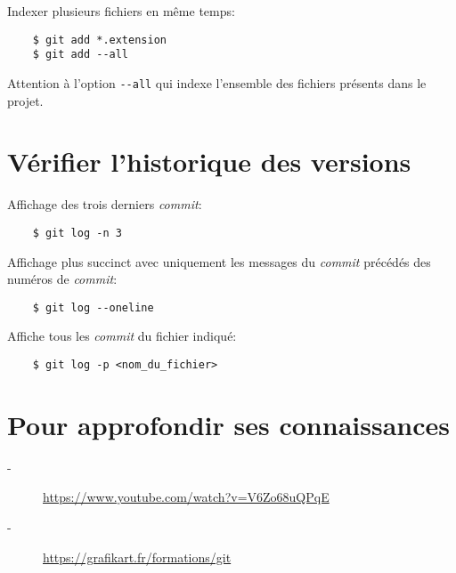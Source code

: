 \documentclass[a4paper,11pt,french]{article}
\begin{document}
Indexer plusieurs fichiers en même temps:
\begin{verbatim}
    $ git add *.extension
    $ git add --all
\end{verbatim}
Attention à l'option \verb|--all| qui indexe l'ensemble des fichiers présents dans le projet.
\medskip

\section{Vérifier l'historique des versions}
Affichage des trois derniers \textit{commit}:
\begin{verbatim}
    $ git log -n 3
\end{verbatim}
\medskip

Affichage plus succinct avec uniquement les messages du \textit{commit} précédés des numéros de \textit{commit}:
\begin{verbatim}
    $ git log --oneline
\end{verbatim}
\medskip

Affiche tous les \textit{commit} du fichier indiqué:
\begin{verbatim}
    $ git log -p <nom_du_fichier>
\end{verbatim}
\medskip

\section{Pour approfondir ses connaissances}
\begin{description}
	\item[-] \url{https://www.youtube.com/watch?v=V6Zo68uQPqE}
	\item[-] \url{https://grafikart.fr/formations/git}
\end{description}
\end{document}
